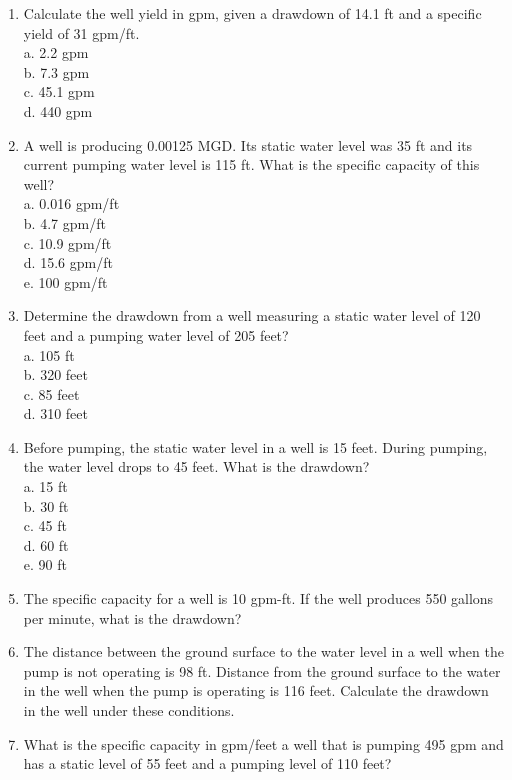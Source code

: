 \begin{enumerate}
\item Calculate the well yield in gpm, given a drawdown of 14.1 ft and a specific yield of 31
gpm/ft.\\
a. 2.2 gpm\\
b. 7.3 gpm\\
c. 45.1 gpm \\
d. 440 gpm\\

\item A well is producing 0.00125 MGD. Its static water level was 35 ft and its current pumping water level is 115 ft. What is the specific capacity of this well? \\
a. 0.016 gpm/ft\\
b. 4.7 gpm/ft\\
c. 10.9 gpm/ft\\
d. 15.6 gpm/ft\\
e. 100 gpm/ft\\

\item Determine the drawdown from a well measuring a static water level of 120 feet and a pumping water level of 205 feet?\\
a. 105 ft\\
b. 320 feet\\
c. 85 feet\\
d. 310 feet\\

\item Before pumping, the static water level in a well is 15 feet. During pumping, the water
level drops to 45 feet. What is the drawdown?\\
a. 15 ft\\
b. 30 ft\\
c. 45 ft\\
d. 60 ft\\
e. 90 ft\\


\item The specific capacity for a well is 10 gpm-ft. If the well produces 550 gallons per minute, what is the drawdown?

\item The distance between the ground surface to the water level in a well when the pump is not operating is 98 ft.  Distance from the ground surface to the water in the well when the pump is operating is 116 feet. Calculate the drawdown in the well under these conditions.

\item What is the specific capacity in gpm/feet a well that is pumping 495 gpm and has a
static level of 55 feet and a pumping level of 110 feet?


\end{enumerate}
